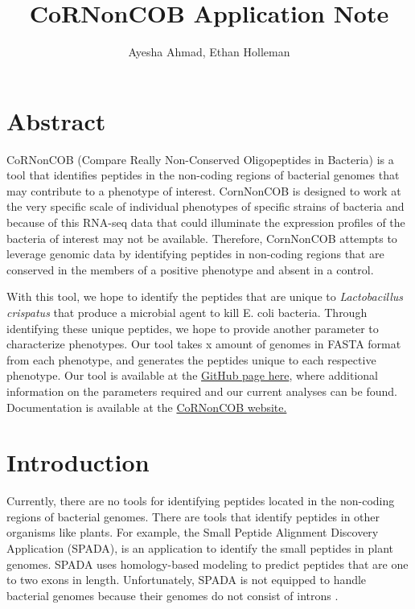 \documentclass{article}
\begin{document}
\title{CoRNonCOB Application Note
	   \medskip \large}
\author{Ayesha Ahmad, Ethan Holleman}

\maketitle

\newpage

\section{Abstract}
CoRNonCOB (Compare Really Non-Conserved Oligopeptides in Bacteria) is a tool that identifies peptides in the non-coding regions of bacterial genomes that may contribute to a phenotype of interest. CornNonCOB is designed to work at the very specific scale of individual phenotypes of specific strains of bacteria and because of this RNA-seq data that could illuminate the expression profiles of the bacteria of interest may not be available. Therefore, CornNonCOB attempts to leverage genomic data by identifying peptides in non-coding regions that are conserved in the members of a positive phenotype and absent in a control.

With this tool, we hope to identify the peptides that are unique to \emph{Lactobacillus crispatus} that produce a microbial agent to kill E. coli bacteria. Through identifying these unique peptides, we hope to provide another parameter to characterize phenotypes. Our tool takes x amount of genomes in FASTA format  from each phenotype, and generates the peptides unique to each respective phenotype. Our tool is available at the \href{ https://github.com/EthanHolleman/CoRNonCOB}{GitHub page here}, where additional information on the parameters required and our current analyses can be found. Documentation is available at the \href{https://ethanholleman.github.io/CoRNonCOB/index.html}{CoRNonCOB website.}

\section{Introduction}
Currently, there are no tools for identifying peptides located in the non-coding regions of bacterial genomes. There are tools that identify peptides in other organisms like plants. For example, the Small Peptide Alignment Discovery Application (SPADA), is an application to identify the small peptides in plant genomes. SPADA uses homology-based modeling to predict peptides that are one to two exons in length. Unfortunately, SPADA is not equipped to handle bacterial genomes because their genomes do not consist of introns \cite{zhou_silverstein_gao_walton_nallu_guhlin_young_2013}.
\end{document}
